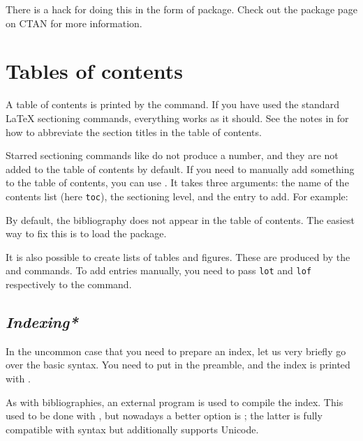 There is a hack for doing this in the form of  package.
Check out the package page on CTAN for more information.




%
%
%
\section{Tables of contents}

A table of contents is printed by the  command.
If you have used the standard \LaTeX{} sectioning commands,
everything works as it should.
See the notes in 
for how to abbreviate the section titles in the table of contents.

Starred sectioning commands like  do not produce a number,
and they are not added to the table of contents by default.
If you need to manually add something to the table of contents,
you can use .
It takes three arguments:
the name of the contents list (here \verb|toc|), the sectioning level, and the entry to add.
For example:
\begin{ExampleCode}
\end{ExampleCode}

By default, the bibliography does not appear in the table of contents.
The easiest way to fix this is to load the  package.

It is also possible to create lists of tables and figures.
These are produced by the  and  commands.
To add entries manually, you need to pass \verb|lot| and \verb|lof|
respectively to the  command.


%
\subsection{\emph{Indexing*}}\label{sec:index}

In the uncommon case that you need to prepare an index,
let us very briefly go over the basic syntax.
You need to put  in the preamble,
and the index is printed with .

As with bibliographies, an external program is used to compile the index.
This used to be done with ,
but nowadays a better option is ;
the latter is fully compatible with  syntax
but additionally supports Unicode.

